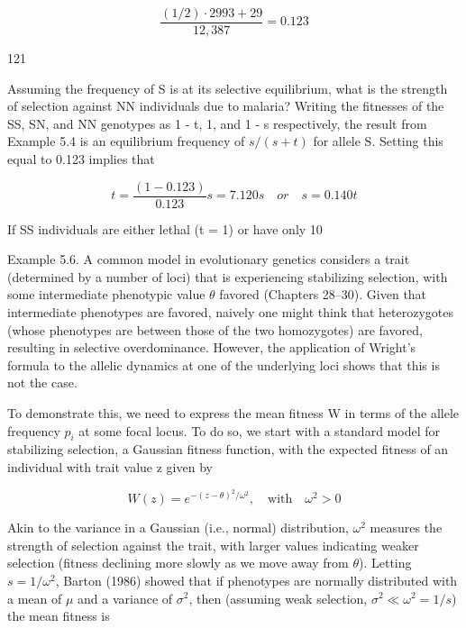 \documentclass{article}
\begin{document}
\begin{equation}
\frac{(1/2)\cdot2993+29}{12,387}=0.123
\end{equation}

121

Assuming the frequency of S is at its selective equilibrium, what is the strength of selection against NN individuals due to malaria? Writing the fitnesses of the SS, SN, and NN genotypes as 1 - t, 1, and 1 - s respectively, the result from Example 5.4 is an equilibrium frequency of  $ s/(s + t) $ for allele S. Setting this equal to 0.123 implies that

\begin{equation}
t=\frac{(1-0.123)}{0.123}s=7.120s\quad or\quad s=0.140t
\end{equation}

If SS individuals are either lethal (t = 1) or have only 10%

Example 5.6. A common model in evolutionary genetics considers a trait (determined by a number of loci) that is experiencing stabilizing selection, with some intermediate phenotypic value  $ \theta $ favored (Chapters 28–30). Given that intermediate phenotypes are favored, naively one might think that heterozygotes (whose phenotypes are between those of the two homozygotes) are favored, resulting in selective overdominance. However, the application of Wright's formula to the allelic dynamics at one of the underlying loci shows that this is not the case.

To demonstrate this, we need to express the mean fitness W in terms of the allele frequency  $ p_{i} $ at some focal locus. To do so, we start with a standard model for stabilizing selection, a Gaussian fitness function, with the expected fitness of an individual with trait value z given by

\begin{equation}
W(z)=e^{-(z-\theta)^{2}/\omega^{2}},\quad\mathrm{w i t h}\quad\omega^{2}>0
\end{equation}

Akin to the variance in a Gaussian (i.e., normal) distribution,  $ \omega^2 $ measures the strength of selection against the trait, with larger values indicating weaker selection (fitness declining more slowly as we move away from  $ \theta $). Letting  $ s = 1/\omega^2 $, Barton (1986) showed that if phenotypes are normally distributed with a mean of  $ \mu $ and a variance of  $ \sigma^2 $, then (assuming weak selection,  $ \sigma^2 \ll \omega^2 = 1/s $) the mean fitness is
\end{document}
